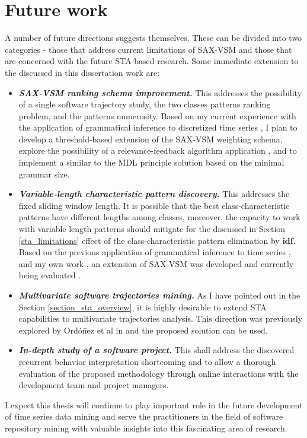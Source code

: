\section{Future work}\label{section_future_work}
A number of future directions suggests themselves. These can be divided into two categories - those that address current 
limitations of SAX-VSM and those that are concerned with the future STA-based research. Some immediate extension to the 
discussed in this dissertation work are:
\begin{itemize}
 \item \textit{\textbf{SAX-VSM ranking schema improvement.}} This addresses the possibility of a single software trajectory study, 
 the two classes patterns ranking problem, and the patterns numerosity. 
 Based on my current experience with the application of grammatical inference to discretized time series \cite{grammarviz2}, 
 I plan to develop a threshold-based extension of the SAX-VSM weighting schema, 
 explore the possibility of a relevance-feedback algorithm application \cite{intro_ir_Manning}, 
 and to implement a similar to the MDL principle \cite{mdl} solution based on the minimal grammar size.
 \item \textit{\textbf{Variable-length characteristic pattern discovery.}} This addresses the fixed sliding window length. 
 It is possible that the best class-characteristic patterns have different lengths among classes, moreover, the capacity to 
 work with variable length patterns should mitigate for the discussed in Section \ref{sta_limitations} effect of the class-characteristic pattern elimination by \textbf{idf}. Based on the previous application of grammatical inference to time series \cite{grammarviz}, and my own work \cite{grammarviz2}, an extension of SAX-VSM was developed and currently being evaluated \cite{saxvsm2}.
 \item \textit{\textbf{Multivariate software trajectories mining.}} As I have pointed out in the Section \ref{section_sta_overview}, 
 it is highly desirable to extend STA capabilities to multivariate trajectories analysis. This direction was previously explored 
 by  Ord\'{o}\={n}ez et al in \cite{oates1, oates2} and the proposed solution can be used.
 \item \textit{\textbf{In-depth study of a software project.}} This shall address the discovered recurrent behavior
 interpretation shortcoming and to allow a thorough evaluation of the proposed methodology through online interactions with the development team and project managers. 
\end{itemize}

I expect this thesis will continue to play important role in the future development of time series data mining and serve the practitioners in the field of software repository mining with valuable insights into this fascinating area of research.
